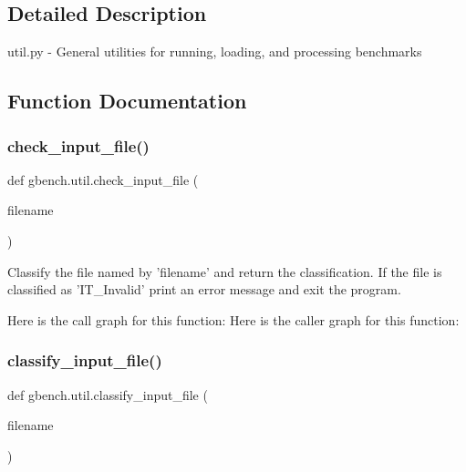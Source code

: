 \subsection{Detailed Description}
\begin{DoxyVerb}util.py - General utilities for running, loading, and processing benchmarks
\end{DoxyVerb}
 

\subsection{Function Documentation}
\mbox{\label{namespacegbench_1_1util_aa332d3ac64581e88c71debd765ebd14e}} 
\subsubsection{\texorpdfstring{check\+\_\+input\+\_\+file()}{check\_input\_file()}}
{\footnotesize\ttfamily def gbench.\+util.\+check\+\_\+input\+\_\+file (\begin{DoxyParamCaption}\item[{}]{filename }\end{DoxyParamCaption})}

\begin{DoxyVerb}Classify the file named by 'filename' and return the classification.
If the file is classified as 'IT_Invalid' print an error message and exit
the program.
\end{DoxyVerb}
 Here is the call graph for this function\+:
Here is the caller graph for this function\+:
\mbox{\label{namespacegbench_1_1util_a25ee5a7452eb3618b88659be49dc48d8}} 
\subsubsection{\texorpdfstring{classify\+\_\+input\+\_\+file()}{classify\_input\_file()}}
{\footnotesize\ttfamily def gbench.\+util.\+classify\+\_\+input\+\_\+file (\begin{DoxyParamCaption}\item[{}]{filename }\end{DoxyParamCaption})}

